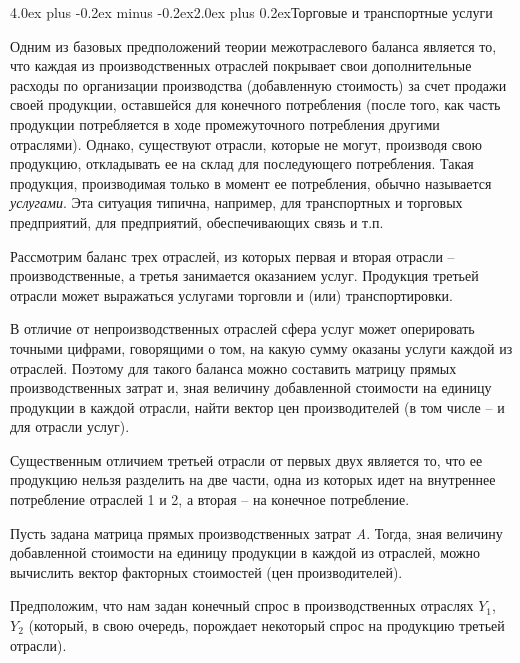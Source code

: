 \documentclass[12pt, 4paper]{book}
\makeatletter
\renewcommand{\section}{\@startsection{section}{1}{1pt}%
	{4.0ex plus -0.2ex minus -0.2ex}{2.0ex plus 0.2ex}{\centering\bf}}%
\makeatother
\begin{document}
{\section{Торговые и транспортные услуги}
\par
\hspace{0.5cm}
Одним из базовых предположений теории межотраслевого баланса является то, что каждая из производственных отраслей покрывает свои дополнительные расходы по организации производства (добавленную стоимость) за счет продажи своей продукции, оставшейся для конечного потребления (после того, как часть продукции потребляется в ходе промежуточного потребления другими отраслями). Однако, существуют отрасли, которые не могут, производя свою продукцию, откладывать ее на склад для последующего потребления. Такая продукция, производимая только в момент ее потребления, обычно называется \textit{услугами}. Эта ситуация типична, например, для транспортных и торговых предприятий, для предприятий, обеспечивающих связь и т.п.
\par
\hspace{0.5cm}
Рассмотрим баланс трех отраслей, из которых первая и вторая отрасли – производственные, а третья занимается оказанием услуг. Продукция третьей отрасли может выражаться услугами торговли и (или) транспортировки. 
\par
\hspace{0.5cm}
В отличие от непроизводственных отраслей сфера услуг может оперировать точными цифрами, говорящими о том, на какую сумму оказаны услуги каждой из отраслей. Поэтому для такого баланса можно составить матрицу прямых производственных затрат и, зная величину добавленной стоимости на единицу продукции в каждой отрасли, найти вектор цен производителей (в том числе – и для отрасли услуг).
\par
\hspace{0.5cm}
Существенным отличием третьей отрасли от первых двух является то, что ее продукцию нельзя разделить на две части, одна из которых идет на внутреннее потребление отраслей 1 и 2, а вторая – на конечное потребление.
\par
\hspace{0.5cm}
Пусть задана матрица прямых производственных затрат \textit{A}. Тогда, зная величину добавленной стоимости на единицу продукции в каждой из отраслей, можно вычислить вектор факторных стоимостей (цен производителей).
\par
\hspace{0.5cm}
Предположим, что нам задан конечный спрос в производственных отраслях $ Y_1 $, $ Y_2 $ (который, в свою очередь, порождает некоторый спрос на продукцию третьей отрасли).
}
\end{document}
